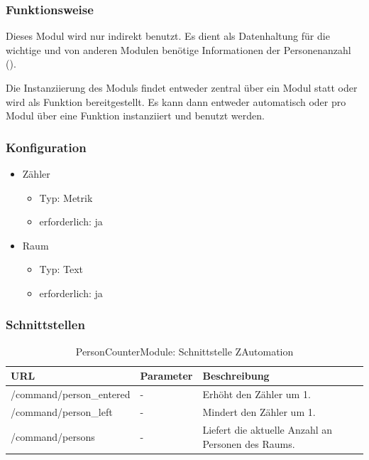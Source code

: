 \subsubsection{Funktionsweise}
Dieses Modul wird nur indirekt benutzt. Es dient als Datenhaltung für die wichtige und von anderen Modulen benötige Informationen der Personenanzahl ().

Die Instanziierung des Moduls findet entweder zentral über ein Modul statt oder wird als Funktion bereitgestellt. Es kann dann entweder automatisch oder pro Modul über eine Funktion instanziiert und benutzt werden.

\subsubsection{Konfiguration}
\begin{itemize}
	\item Zähler
	\begin{itemize}
		\item Typ: Metrik
		\item erforderlich: ja
	\end{itemize}
	\item Raum
	\begin{itemize}
		\item Typ: Text
		\item erforderlich: ja
	\end{itemize}
\end{itemize}

\subsubsection{Schnittstellen}

\begin{table}[H]
	\begin{tabularx}{\textwidth}{
			>{\hsize=1.25\hsize}X %
			>{\hsize=0.5\hsize\centering}X %
			>{\hsize=1.25\hsize}X %
		}
		\hline
		\textbf{URL}						& \textbf{Parameter}	& \textbf{Beschreibung} \\
		\hline /command/person\_entered		& - 					& Erhöht den Zähler um 1. \\ 
		\hline /command/person\_left		& - 			 		& Mindert den Zähler um 1. \\
		\hline /command/persons				& - 					& Liefert die aktuelle Anzahl an Personen des Raums. \\
		\hline
	\end{tabularx}
	\caption{PersonCounterModule: Schnittstelle ZAutomation}
\end{table}

